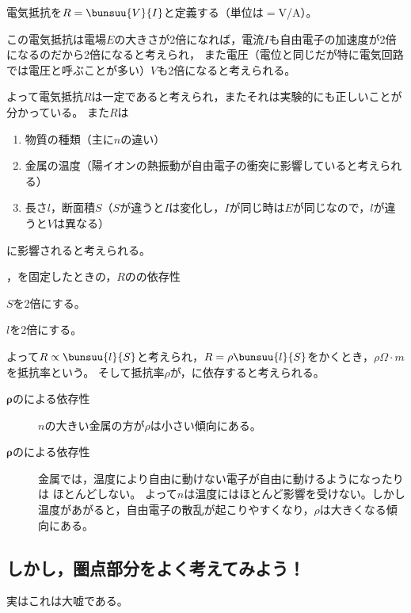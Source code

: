  電気抵抗を$R=\bunsuu{V}{I}$と定義する（単位は\unit{}${}={}$\unit{V/A}）。

 この電気抵抗は電場$E$の大きさが2倍になれば，電流$I$も自由電子の加速度が2倍になるのだから2倍になると考えられ，
 また電圧（電位と同じだが特に電気回路では電圧と呼ぶことが多い）$V$も2倍になると考えられる。

 よって電気抵抗$R$は一定であると考えられ，またそれは実験的にも正しいことが分かっている。
 また$R$は
 \begin{enumerate}
  \item 物質の種類（主に$n$の違い）
  \item 金属の温度（陽イオンの熱振動が自由電子の衝突に影響していると考えられる）
  \item 長さ$l$，断面積$S$（$S$が違うと$I$は変化し，$I$が同じ時は$E$が同じなので，$l$が違うと$V$は異なる）
 \end{enumerate}
 に影響されると考えられる。

 ，を固定したときの，$R$のの依存性

 $S$を2倍にする。


 $l$を2倍にする。


 よって$R\propto\bunsuu{l}{S}$と考えられ，$R=\rho\bunsuu{l}{S}$をかくとき，$\rho\unit{\Omega\cdot m}$を抵抗率という。
 そして抵抗率$\rho$が，に依存すると考えられる。

 \begin{description}
  \item[$\bm\rho$のによる依存性]$n$の大きい金属の方が$\rho$は小さい傾向にある。
  \item[$\bm\rho$のによる依存性]金属では，温度により自由に動けない電子が自由に動けるようになったりは
	     ほとんどしない。
	     よって$n$は温度にはほとんど影響を受けない。しかし温度があがると，自由電子の散乱が起こりやすくなり，$\rho$は大きくなる傾向にある。
 \end{description}

  \subsection{しかし，圏点部分をよく考えてみよう！}\label{抵抗？}

  実はこれは大嘘である。

